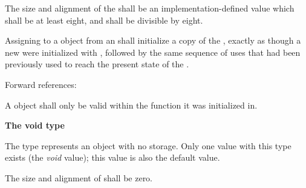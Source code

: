 \specsubsubitem
The size and alignment of the  shall be an
implementation-defined value which shall be at least eight, and shall be
divisible by eight.

\specsubsubitem
Assigning to a  object from an 
shall initialize a copy of the , exactly as though
a new  were initialized with , followed by
the same sequence of  uses that had been previously used to
reach the present state of the .


Forward references: 

\specsubsubitem
A  object shall only be valid within the function it was
initialized in.

\textbf{The void type}

\specsubsubitem
The  type represents an object with no storage. Only one value
with this type exists (the \textit{void} value); this value is also the default
value.

\specsubsubitem
The size and alignment of  shall be zero.


\begin{grammar}
 \\
	  \terminal{\{}  \terminal{\}} \\
	 \terminal{\{}  \terminal{\}} \\

 \\
	 \optional{\terminal{,}} \\
	 \terminal{,}  \\

 \\
	  \terminal{:}  \\
	  \\
	  \\

 \\
	 \terminal{(}  \terminal{)}
\end{grammar}

